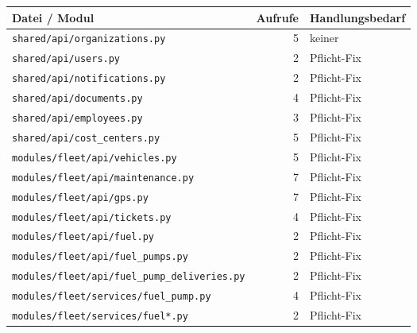 \begin{table}[H]
    \begin{center}
        \renewcommand{\arraystretch}{1.4}
        \begin{tabular}{|l|r|l|}
            \hline
            \textbf{Datei / Modul}                               & \textbf{Aufrufe} & \textbf{Handlungsbedarf} \\
            \hline
            \texttt{shared/api/organizations.py}                 & 5                & keiner                   \\
            \texttt{shared/api/users.py}                         & 2                & Pflicht-Fix              \\
            \texttt{shared/api/notifications.py}                 & 2                & Pflicht-Fix              \\
            \texttt{shared/api/documents.py}                     & 4                & Pflicht-Fix              \\
            \texttt{shared/api/employees.py}                     & 3                & Pflicht-Fix              \\
            \texttt{shared/api/cost\_centers.py}                 & 5                & Pflicht-Fix              \\
            \hline
            \texttt{modules/fleet/api/vehicles.py}               & 5                & Pflicht-Fix              \\
            \texttt{modules/fleet/api/maintenance.py}            & 7                & Pflicht-Fix              \\
            \texttt{modules/fleet/api/gps.py}                    & 7                & Pflicht-Fix              \\
            \texttt{modules/fleet/api/tickets.py}                & 4                & Pflicht-Fix              \\
            \texttt{modules/fleet/api/fuel.py}                   & 2                & Pflicht-Fix              \\
            \texttt{modules/fleet/api/fuel\_pumps.py}            & 2                & Pflicht-Fix              \\
            \texttt{modules/fleet/api/fuel\_pump\_deliveries.py} & 2                & Pflicht-Fix              \\
            \texttt{modules/fleet/services/fuel\_pump.py}        & 4                & Pflicht-Fix              \\
            \texttt{modules/fleet/services/fuel*.py}             & 2                & Pflicht-Fix              \\

\end{tabular}
\end{center}
\end{table}
